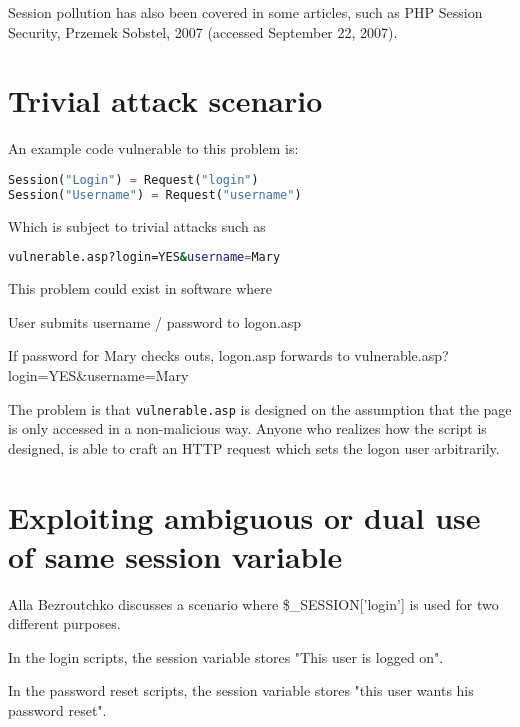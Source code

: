 Session pollution has also been covered in some articles, such as PHP Session Security, Przemek Sobstel, 2007 (accessed September 22, 2007).



\section{Trivial attack scenario}


An example code vulnerable to this problem is:

\begin{lstlisting}[language=PHP]
Session("Login") = Request("login")
Session("Username") = Request("username")
\end{lstlisting}

Which is subject to trivial attacks such as

\begin{lstlisting}[language=bash]
vulnerable.asp?login=YES&username=Mary
\end{lstlisting}


This problem could exist in software where

\begin{compactitem}
\item User submits username / password to logon.asp
\item If password for Mary checks outs, logon.asp forwards to vulnerable.asp?login=YES\&username=Mary

\end{compactitem}


The problem is that \texttt{vulnerable.asp} is designed on the assumption that the page is only accessed in a non-malicious way. Anyone who realizes how the script is designed, is able to craft an HTTP request which sets the logon user arbitrarily.





\section{Exploiting ambiguous or dual use of same session variable}

Alla Bezroutchko discusses a scenario where \$\_SESSION['login'] is used for two different purposes.

\begin{compactitem}
\item In the login scripts, the session variable stores "This user is logged on".
\item In the password reset scripts, the session variable stores "this user wants his password reset".

\end{compactitem}


